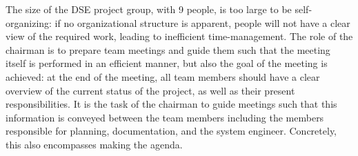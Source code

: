 The size of the DSE project group, with 9 people, is too large to be self-organizing: if no organizational structure is apparent, people will not have a clear view of the required work, leading to inefficient time-management. The role of the chairman is to prepare team meetings and guide them such that the meeting itself is performed in an efficient manner, but also the goal of the meeting is achieved: at the end of the meeting, all team members should have a clear overview of the current status of the project, as well as their present responsibilities. It is the task of the chairman to guide meetings such that this information is conveyed between the team members including the members responsible for planning, documentation, and the system engineer. Concretely, this also encompasses making the agenda.